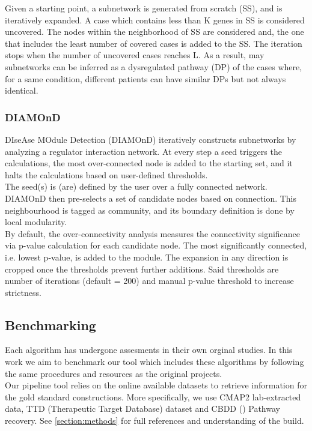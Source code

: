 Given a starting point, a subnetwork is generated from scratch (SS), and is iteratively expanded. A case which contains less than K genes in SS is considered uncovered. The nodes within the neighborhood of SS are considered and, the one that includes the least number of covered cases is added to the SS. The iteration stops when the number of uncovered cases reaches L. As a result, may subnetworks can be inferred as a dysregulated pathway (DP) of the cases where, for a same condition, different patients can have similar DPs but not always identical.

\subsubsection{DIAMOnD}
DIseAse MOdule Detection (DIAMOnD) \cite{Ghiassian2015AInteractome} iteratively constructs subnetworks by analyzing a regulator interaction network. At every step a seed triggers the calculations, the most over-connected node is added to the starting set, and it halts the calculations based on user-defined thresholds.
\\

The seed(s) is (are) defined by the user over a fully connected network. DIAMOnD then pre-selects a set of candidate nodes based on connection. This neighbourhood is tagged as community, and its boundary definition is done by local modularity.
\\

By default, the over-connectivity analysis measures the connectivity significance via p-value calculation for each candidate node. The most significantly connected, i.e. lowest p-value, is added to the module. The expansion in any direction is cropped once the thresholds prevent further additions. Said thresholds are number of iterations (default = 200) and manual p-value threshold to increase strictness.

\subsection{Benchmarking}
Each algorithm has undergone assesments in their own orginal studies. In this work we aim to benchmark our tool which includes these algorithms by following the same procedures and resources as the original projects. 
\\

Our pipeline tool relies on the online available datasets to retrieve information for the gold standard constructions. More specifically, we use CMAP2 lab-extracted data, TTD (Therapeutic Target Database) dataset and CBDD () Pathway recovery. See \ref{section:methods} for full references and understanding of the build.
\\

